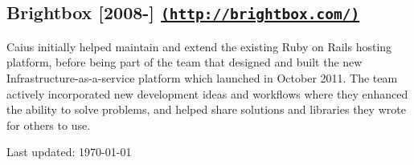 \documentclass[letterpaper]{article}
\begin{document}

\subsection*{Brightbox [2008-\the\year] \href{http://brightbox.com/}{\tt (http://brightbox.com/)}} %
\label{sub:brightbox}

Caius initially helped maintain and extend the existing Ruby on Rails hosting platform, before being part of the team that designed and built the new Infrastructure-as-a-service platform which launched in October 2011. The team actively incorporated new development ideas and workflows where they enhanced the ability to solve problems, and helped share solutions and libraries they wrote for others to use.

\bigskip

\begin{center}
  \begin{footnotesize}
    Last updated: \today
  \end{footnotesize}
\end{center}
\end{document}
